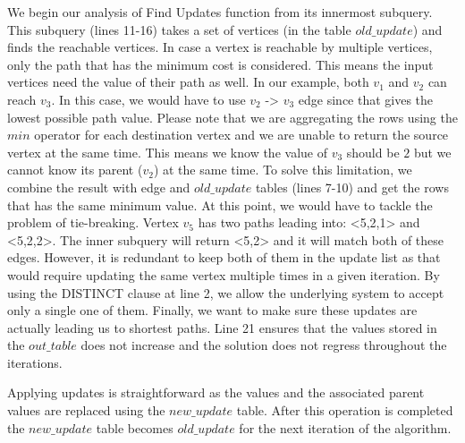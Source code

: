 We begin our analysis of Find Updates function from its innermost subquery. This subquery (lines 11-16) takes a set of vertices (in the table $old\_update$) and finds the reachable vertices. In case a vertex is reachable by multiple vertices, only the path that has the minimum cost is considered. This means the input vertices need the value of their path as well. In our example, both $v_1$ and $v_2$ can reach $v_3$. In this case, we would have to use $v_2$ -> $v_3$ edge since that gives the lowest possible path value. Please note that we are aggregating the rows using the $min$ operator for each destination vertex and we are unable to return the source vertex at the same time. This means we know the value of $v_3$ should be $2$ but we cannot know its parent ($v_2$) at the same time. To solve this limitation, we combine the result with edge and $old\_update$ tables (lines 7-10) and get the rows that has the same minimum value. At this point, we would have to tackle the problem of tie-breaking. Vertex $v_5$ has two paths leading into: <5,2,1> and <5,2,2>. The inner subquery will return <5,2> and it will match both of these edges. However, it is redundant to keep both of them in the update list as that would require updating the same vertex multiple times in a given iteration. By using the DISTINCT clause at line 2, we allow the underlying system to accept only a single one of them. Finally, we want to make sure these updates are actually leading us to shortest paths. Line 21 ensures that the values stored in the $out\_table$ does not increase and the solution does not regress throughout the iterations.

Applying updates is straightforward as the values and the associated parent values are replaced using the $new\_update$ table. After this operation is completed the $new\_update$ table becomes $old\_update$ for the next iteration of the algorithm.

